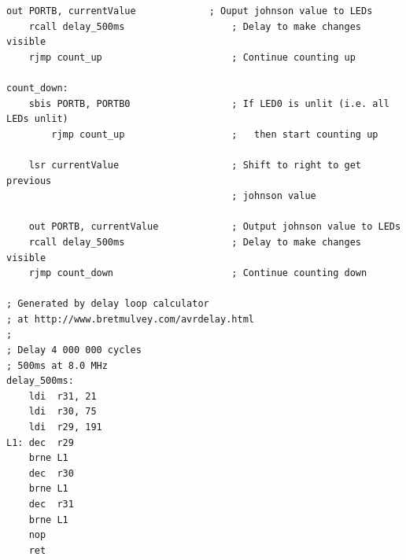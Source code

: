 \documentclass[a4paper, 12pt]{article}
\begin{document}
\begin{lstlisting}[basicstyle=\tiny]
    out PORTB, currentValue             ; Ouput johnson value to LEDs
    rcall delay_500ms                   ; Delay to make changes visible
    rjmp count_up                       ; Continue counting up

count_down:
    sbis PORTB, PORTB0                  ; If LED0 is unlit (i.e. all LEDs unlit)
        rjmp count_up                   ;   then start counting up

    lsr currentValue                    ; Shift to right to get previous
                                        ; johnson value

    out PORTB, currentValue             ; Output johnson value to LEDs
    rcall delay_500ms                   ; Delay to make changes visible
    rjmp count_down                     ; Continue counting down

; Generated by delay loop calculator
; at http://www.bretmulvey.com/avrdelay.html
;
; Delay 4 000 000 cycles
; 500ms at 8.0 MHz
delay_500ms:
    ldi  r31, 21
    ldi  r30, 75
    ldi  r29, 191
L1: dec  r29
    brne L1
    dec  r30
    brne L1
    dec  r31
    brne L1
    nop
    ret

\end{lstlisting}
\end{document}
